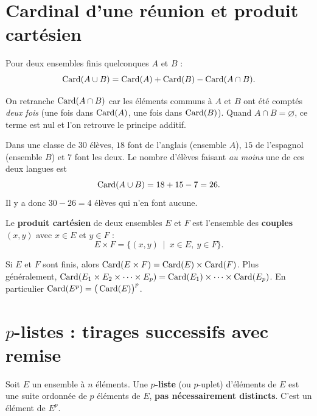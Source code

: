 \section{Cardinal d'une réunion et produit cartésien}

\begin{theoreme}
Pour deux ensembles finis quelconques $A$ et $B$ :
\[ \operatorname{Card}(A\cup B)=\operatorname{Card}(A)+\operatorname{Card}(B)-\operatorname{Card}(A\cap B). \]
\end{theoreme}

\begin{remarque}
On retranche $\operatorname{Card}(A\cap B)$ car les éléments communs à $A$ et $B$ ont été comptés
\emph{deux fois} (une fois dans $\operatorname{Card}(A)$, une fois dans $\operatorname{Card}(B)$). Quand
$A\cap B=\varnothing$, ce terme est nul et l'on retrouve le principe additif.
\end{remarque}

\begin{exemple}
Dans une classe de $30$ élèves, $18$ font de l'anglais (ensemble $A$), $15$ de
l'espagnol (ensemble $B$) et $7$ font les deux. Le nombre d'élèves faisant
\emph{au moins} une de ces deux langues est
\[ \operatorname{Card}(A\cup B)=18+15-7=26. \]
Il y a donc $30-26=4$ élèves qui n'en font aucune.
\end{exemple}

\begin{definition}
Le \textbf{produit cartésien} de deux ensembles $E$ et $F$ est l'ensemble des
\textbf{couples} $(x,y)$ avec $x\in E$ et $y\in F$ :
\[ E\times F=\big\{(x,y)\ \mid\ x\in E,\ y\in F\big\}. \]
\end{definition}

\begin{propriete}
Si $E$ et $F$ sont finis, alors $\operatorname{Card}(E\times F)=\operatorname{Card}(E)\times\operatorname{Card}(F)$. Plus
généralement, $\operatorname{Card}(E_1\times E_2\times\cdots\times E_p)=\operatorname{Card}(E_1)\times\cdots\times\operatorname{Card}(E_p)$.
En particulier $\operatorname{Card}(E^p)=\big(\operatorname{Card}(E)\big)^p$.
\end{propriete}

\section{$p$-listes : tirages successifs avec remise}

\begin{definition}[$p$-liste]
Soit $E$ un ensemble à $n$ éléments. Une \textbf{$p$-liste} (ou $p$-uplet) d'éléments
de $E$ est une suite ordonnée de $p$ éléments de $E$, \textbf{pas nécessairement
distincts}. C'est un élément de $E^p$.
\end{definition}

